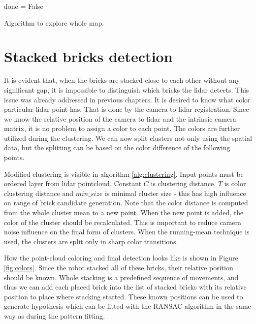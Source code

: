 \begin{algorithm}[H]
	done = False\;
	\caption{Algorithm to explore whole map.}
	\label{alg:exploration}
\end{algorithm}

\section{Stacked bricks detection}
It is evident that, when the bricks are stacked close to each other without any significant gap, it is impossible to distinguish which bricks the lidar detects. This issue was already addressed in previous chapters. It is desired to know what color particular lidar point has. That is done by the camera to lidar registration. Since we know the relative position of the camera to lidar and the intrinsic camera matrix, it is no problem to assign a color to each point. The colors are further utilized during the clustering. We can now split clusters not only using the spatial data, but the splitting can be based on the color difference of the following points. 

Modified clustering is visible in algorithm \ref{alg:clustering}. Input points must be ordered layer from lidar pointcloud. Constant $C$ is clustering distance, $T$ is color clustering distance and $min\_size$ is minimal cluster size - this has high influence on range of brick candidate generation. Note that the color distance is computed from the whole cluster mean to a new point. When the new point is added, the color of the cluster should be recalculated. This is important to reduce camera noise influence on the final form of clusters. When the running-mean technique is used, the clusters are split only in sharp color transitions. 

How the point-cloud coloring and final detection looks like is shown in Figure  \ref{fig:colors}. Since the robot stacked all of these bricks, their relative position should be known. Whole stacking is a predefined sequence of movements, and thus we can add each placed brick into the list of stacked bricks with its relative position to place where stacking started. These known positions can be used to generate hypothesis which can be fitted with the RANSAC algorithm in the same way as during the pattern fitting. 

